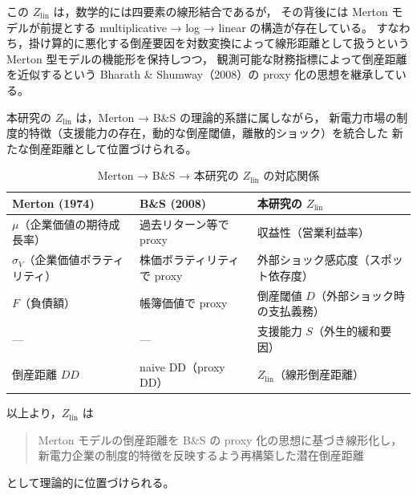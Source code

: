 この $Z_{\text{lin}}$ は，数学的には四要素の線形結合であるが，
その背後には Merton モデルが前提とする
multiplicative → log → linear の構造が存在している。
すなわち，掛け算的に悪化する倒産要因を対数変換によって線形距離として扱うという
Merton 型モデルの機能形を保持しつつ，
観測可能な財務指標によって倒産距離を近似するという
Bharath \& Shumway（2008）の proxy 化の思想を継承している。

本研究の $Z_{\text{lin}}$ は，Merton → B\&S の理論的系譜に属しながら，
新電力市場の制度的特徴（支援能力の存在，動的な倒産閾値，離散的ショック）を統合した
新たな倒産距離として位置づけられる。

\begin{table}[H]
\centering
\caption{Merton → B\&S → 本研究の $Z_{\text{lin}}$ の対応関係}
\label{tab:merton_bs_zlin}

\renewcommand{\arraystretch}{1.4}
\begin{tabularx}{\textwidth}{p{} p{} X}
\toprule
\textbf{Merton (1974)} & \textbf{B\&S (2008)} & \textbf{本研究の $Z_{\text{lin}}$} \\
\midrule

$\mu$（企業価値の期待成長率） &
過去リターン等で proxy &
収益性（営業利益率） \\

$\sigma_V$（企業価値ボラティリティ） &
株価ボラティリティで proxy &
外部ショック感応度（スポット依存度） \\

$F$（負債額） &
帳簿価値で proxy &
倒産閾値 $D$（外部ショック時の支払義務） \\

--- & --- &
支援能力 $S$（外生的緩和要因） \\

\midrule

倒産距離 $DD$ &
naive DD（proxy DD） &
$Z_{\text{lin}}$（線形倒産距離） \\

\bottomrule
\end{tabularx}
\end{table}

以上より，$Z_{\text{lin}}$ は

\begin{quote}
Merton モデルの倒産距離を B\&S の proxy 化の思想に基づき線形化し，
新電力企業の制度的特徴を反映するよう再構築した潜在倒産距離
\end{quote}

として理論的に位置づけられる。

